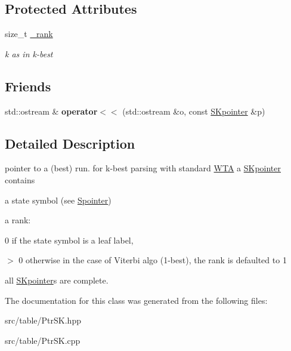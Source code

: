 \subsection*{Protected Attributes}
\begin{DoxyCompactItemize}
\item 
\mbox{\label{classSKpointer_a532a7a3f69049503ccf94834b77f48f3}} 
size\+\_\+t \mbox{\hyperlink{classSKpointer_a532a7a3f69049503ccf94834b77f48f3}{\+\_\+rank}}
\begin{DoxyCompactList}\small\item\em k as in k-\/best \end{DoxyCompactList}\end{DoxyCompactItemize}
\subsection*{Friends}
\begin{DoxyCompactItemize}
\item 
\mbox{\label{classSKpointer_a408ad7443ca740b3f261b7ef920bc26f}} 
std\+::ostream \& {\bfseries operator$<$$<$} (std\+::ostream \&o, const \mbox{\hyperlink{classSKpointer}{S\+Kpointer}} \&p)
\end{DoxyCompactItemize}


\subsection{Detailed Description}
pointer to a (best) run. for k-\/best parsing with standard \mbox{\hyperlink{classWTA}{W\+TA}} a \mbox{\hyperlink{classSKpointer}{S\+Kpointer}} contains 


\begin{DoxyItemize}
\item a state symbol (see \mbox{\hyperlink{classSpointer}{Spointer}})
\item a rank\+:
\begin{DoxyItemize}
\item 0 if the state symbol is a leaf label,
\item $>$ 0 otherwise in the case of Viterbi algo (1-\/best), the rank is defaulted to 1
\end{DoxyItemize}
\end{DoxyItemize}

all \mbox{\hyperlink{classSKpointer}{S\+Kpointer}}\textquotesingle{}s are complete. 

The documentation for this class was generated from the following files\+:\begin{DoxyCompactItemize}
\item 
src/table/Ptr\+S\+K.\+hpp\item 
src/table/Ptr\+S\+K.\+cpp\end{DoxyCompactItemize}
